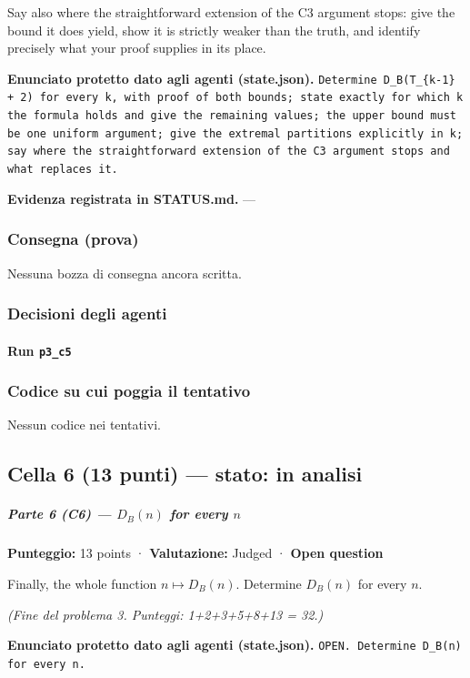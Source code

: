 \documentclass[11pt,a4paper]{article}
\begin{document}
Say also where the straightforward extension of the C3 argument stops:
give the bound it does yield, show it is strictly weaker than the truth,
and identify precisely what your proof supplies in its place.

\textbf{Enunciato protetto dato agli agenti (state.json).} \texttt{Determine D\_B(T\_\{k-1\} + 2) for every k, with proof of both bounds; state exactly for which k the formula holds and give the remaining values; the upper bound must be one uniform argument; give the extremal partitions explicitly in k; say where the straightforward extension of the C3 argument stops and what replaces it.}

\textbf{Evidenza registrata in STATUS.md.} —

\subsubsection{Consegna (prova)}
Nessuna bozza di consegna ancora scritta.

\subsubsection{Decisioni degli agenti}
\paragraph{Run \texttt{p3\_c5}}

\subsubsection{Codice su cui poggia il tentativo}
Nessun codice nei tentativi.

\subsection{Cella 6 (13 punti) — stato: in analisi}
\subparagraph{\texorpdfstring{Parte 6 (C6) --- \(D_B(n)\) for every
\(n\)}{Parte 6 (C6) --- D\_B(n) for every n}}\label{parte-6-c6-d_bn-for-every-n}

\textbf{Punteggio:} 13 points · \textbf{Valutazione:} Judged ·
\textbf{Open question}

Finally, the whole function \(n \mapsto D_B(n)\). Determine \(D_B(n)\)
for every \(n\).

\emph{(Fine del problema 3. Punteggi: 1+2+3+5+8+13 = 32.)}

\textbf{Enunciato protetto dato agli agenti (state.json).} \texttt{OPEN. Determine D\_B(n) for every n.}
\end{document}
